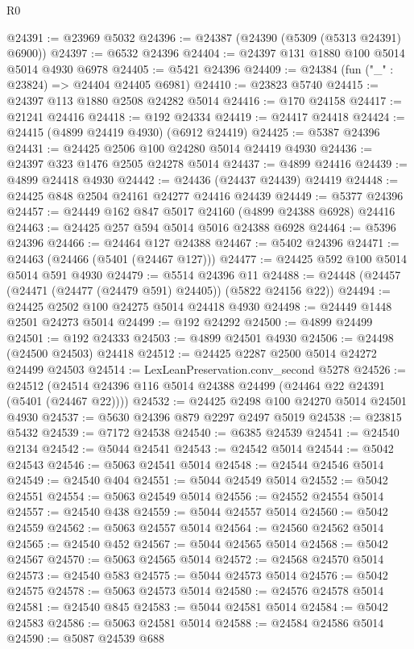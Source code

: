 \begin{lexlean}{R0}
\begin{coremodule}
@24391 := @23969 @5032
@24396 := @24387 (@24390 (@5309 (@5313 @24391) @6900))
@24397 := @6532 @24396
@24404 := @24397 @131 @1880 @100 @5014 @5014 @4930 @6978
@24405 := @5421 @24396
@24409 := @24384 (fun ("_" : @23824) => @24404 @24405 @6981)
@24410 := @23823 @5740
@24415 := @24397 @113 @1880 @2508 @24282 @5014
@24416 := @170 @24158
@24417 := @21241 @24416
@24418 := @192 @24334
@24419 := @24417 @24418
@24424 := @24415 (@4899 @24419 @4930) (@6912 @24419)
@24425 := @5387 @24396
@24431 := @24425 @2506 @100 @24280 @5014 @24419 @4930
@24436 := @24397 @323 @1476 @2505 @24278 @5014
@24437 := @4899 @24416
@24439 := @4899 @24418 @4930
@24442 := @24436 (@24437 @24439) @24419
@24448 := @24425 @848 @2504 @24161 @24277 @24416 @24439
@24449 := @5377 @24396
@24457 := @24449 @162 @847 @5017 @24160 (@4899 @24388 @6928) @24416
@24463 := @24425 @257 @594 @5014 @5016 @24388 @6928
@24464 := @5396 @24396
@24466 := @24464 @127 @24388
@24467 := @5402 @24396
@24471 := @24463 (@24466 (@5401 (@24467 @127)))
@24477 := @24425 @592 @100 @5014 @5014 @591 @4930
@24479 := @5514 @24396 @11
@24488 := @24448 (@24457 (@24471 (@24477 (@24479 @591) @24405)) (@5822 @24156 @22))
@24494 := @24425 @2502 @100 @24275 @5014 @24418 @4930
@24498 := @24449 @1448 @2501 @24273 @5014
@24499 := @192 @24292
@24500 := @4899 @24499
@24501 := @192 @24333
@24503 := @4899 @24501 @4930
@24506 := @24498 (@24500 @24503) @24418
@24512 := @24425 @2287 @2500 @5014 @24272 @24499 @24503
@24514 := LexLeanPreservation.conv_second @5278
@24526 := @24512 (@24514 @24396 @116 @5014 @24388 @24499 (@24464 @22 @24391 (@5401 (@24467 @22))))
@24532 := @24425 @2498 @100 @24270 @5014 @24501 @4930
@24537 := @5630 @24396 @879 @2297 @2497 @5019
@24538 := @23815 @5432
@24539 := @7172 @24538
@24540 := @6385 @24539
@24541 := @24540 @2134
@24542 := @5044 @24541
@24543 := @24542 @5014
@24544 := @5042 @24543
@24546 := @5063 @24541 @5014
@24548 := @24544 @24546 @5014
@24549 := @24540 @404
@24551 := @5044 @24549 @5014
@24552 := @5042 @24551
@24554 := @5063 @24549 @5014
@24556 := @24552 @24554 @5014
@24557 := @24540 @438
@24559 := @5044 @24557 @5014
@24560 := @5042 @24559
@24562 := @5063 @24557 @5014
@24564 := @24560 @24562 @5014
@24565 := @24540 @452
@24567 := @5044 @24565 @5014
@24568 := @5042 @24567
@24570 := @5063 @24565 @5014
@24572 := @24568 @24570 @5014
@24573 := @24540 @583
@24575 := @5044 @24573 @5014
@24576 := @5042 @24575
@24578 := @5063 @24573 @5014
@24580 := @24576 @24578 @5014
@24581 := @24540 @845
@24583 := @5044 @24581 @5014
@24584 := @5042 @24583
@24586 := @5063 @24581 @5014
@24588 := @24584 @24586 @5014
@24590 := @5087 @24539 @688

\end{coremodule}
\end{lexlean}
